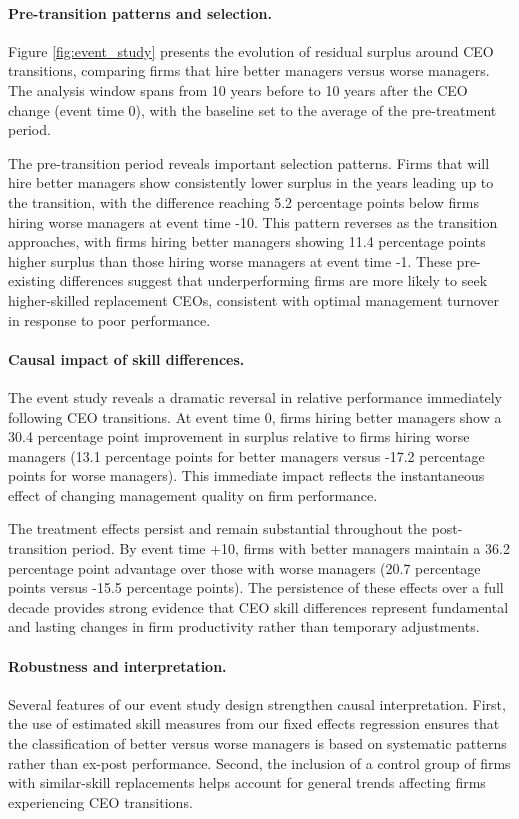 \documentclass[11pt,a4paper]{article}
\begin{document}
\paragraph{Pre-transition patterns and selection.} Figure \ref{fig:event_study} presents the evolution of residual surplus around CEO transitions, comparing firms that hire better managers versus worse managers. The analysis window spans from 10 years before to 10 years after the CEO change (event time 0), with the baseline set to the average of the pre-treatment period.

The pre-transition period reveals important selection patterns. Firms that will hire better managers show consistently lower surplus in the years leading up to the transition, with the difference reaching 5.2 percentage points below firms hiring worse managers at event time -10. This pattern reverses as the transition approaches, with firms hiring better managers showing 11.4 percentage points higher surplus than those hiring worse managers at event time -1. These pre-existing differences suggest that underperforming firms are more likely to seek higher-skilled replacement CEOs, consistent with optimal management turnover in response to poor performance.

\paragraph{Causal impact of skill differences.} The event study reveals a dramatic reversal in relative performance immediately following CEO transitions. At event time 0, firms hiring better managers show a 30.4 percentage point improvement in surplus relative to firms hiring worse managers (13.1 percentage points for better managers versus -17.2 percentage points for worse managers). This immediate impact reflects the instantaneous effect of changing management quality on firm performance.

The treatment effects persist and remain substantial throughout the post-transition period. By event time +10, firms with better managers maintain a 36.2 percentage point advantage over those with worse managers (20.7 percentage points versus -15.5 percentage points). The persistence of these effects over a full decade provides strong evidence that CEO skill differences represent fundamental and lasting changes in firm productivity rather than temporary adjustments.

\paragraph{Robustness and interpretation.} Several features of our event study design strengthen causal interpretation. First, the use of estimated skill measures from our fixed effects regression ensures that the classification of better versus worse managers is based on systematic patterns rather than ex-post performance. Second, the inclusion of a control group of firms with similar-skill replacements helps account for general trends affecting firms experiencing CEO transitions.
\end{document}
